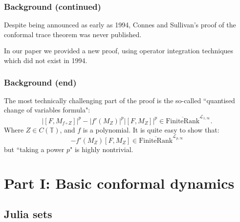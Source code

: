 \documentclass{beamer} %
\theoremstyle{definition} %
\newcommand{\Circ}{\mathbb{T}}
\newcommand{\Lc}{\mathcal{L}}
\newcommand{\FiniteRank}{\mathrm{FiniteRank}}
\newcommand{\SepPart}[1]{\overline{\FiniteRank}^{\Lc_{#1,\infty}}}
\begin{document}
\begin{frame}\frametitle{Background (continued)}
    Despite being announced as early as 1994, Connes and Sullivan's proof of the conformal trace theorem was never published.
    
    In our paper we provided a new proof, using operator integration techniques which did not exist in 1994.
\end{frame}

\begin{frame}\frametitle{Background (end)}
    The most technically challenging part of the proof is the so-called ``quantised change of variables formula":
    \begin{equation*}
        |[F,M_{f\circ Z}]|^p-|f'(M_Z)|^p|[F,M_Z]|^p \in \SepPart{1}.
    \end{equation*}
    Where $Z \in C(\Circ)$, and $f$ is a polynomial.
    It is quite easy to show that:
    \begin{equation*}
        [F,M_{f\circ Z}]-f'(M_Z)[F,M_Z] \in \SepPart{p}
    \end{equation*}
    but ``taking a power $p$" is highly nontrivial.
\end{frame}


\section{Part I: Basic conformal dynamics}

\subsection{Julia sets}
\end{document}
